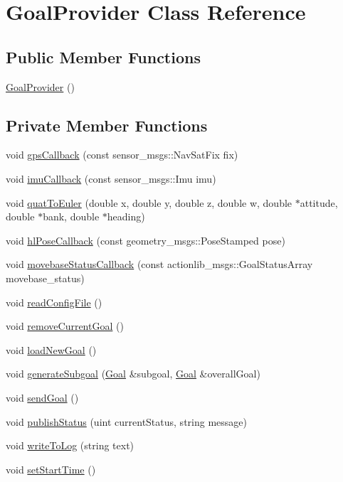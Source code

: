 \hypertarget{classGoalProvider}{\section{\-Goal\-Provider \-Class \-Reference}
\label{classGoalProvider}
}
\subsection*{\-Public \-Member \-Functions}
\begin{DoxyCompactItemize}
\item 
\hyperlink{classGoalProvider_a5f01df42b1cce4fd1ef3aee990ee2442}{\-Goal\-Provider} ()
\end{DoxyCompactItemize}
\subsection*{\-Private \-Member \-Functions}
\begin{DoxyCompactItemize}
\item 
void \hyperlink{classGoalProvider_aa68c410fb110c40cc31dc99320f20a60}{gps\-Callback} (const sensor\-\_\-msgs\-::\-Nav\-Sat\-Fix fix)
\item 
void \hyperlink{classGoalProvider_a9aa7639c95eff543d55fef82ba005088}{imu\-Callback} (const sensor\-\_\-msgs\-::\-Imu imu)
\item 
void \hyperlink{classGoalProvider_a5448a289886afe3e96a900bd0b8557d4}{quat\-To\-Euler} (double x, double y, double z, double w, double $\ast$attitude, double $\ast$bank, double $\ast$heading)
\item 
void \hyperlink{classGoalProvider_a6e91d11b611820597420497fd82613d1}{hl\-Pose\-Callback} (const geometry\-\_\-msgs\-::\-Pose\-Stamped pose)
\item 
void \hyperlink{classGoalProvider_a13d66dd274899d8012a021ef2cbeab7e}{movebase\-Status\-Callback} (const actionlib\-\_\-msgs\-::\-Goal\-Status\-Array movebase\-\_\-status)
\item 
void \hyperlink{classGoalProvider_a58ec86314e501683db946eba1141d464}{read\-Config\-File} ()
\item 
void \hyperlink{classGoalProvider_a8089b33dddf424c923e74d771574edb7}{remove\-Current\-Goal} ()
\item 
void \hyperlink{classGoalProvider_aa8e215f654aa702f0ee949fb95538fed}{load\-New\-Goal} ()
\item 
void \hyperlink{classGoalProvider_aa86d86dde0ce1948dca9a06abf6b3fdd}{generate\-Subgoal} (\hyperlink{classGoal}{\-Goal} \&subgoal, \hyperlink{classGoal}{\-Goal} \&overall\-Goal)
\item 
void \hyperlink{classGoalProvider_ace0fb8a759d933ba643664e4f261241e}{send\-Goal} ()
\item 
void \hyperlink{classGoalProvider_a3ce49c1e51eae73ba9820b89f03b8e5a}{publish\-Status} (uint current\-Status, string message)
\item 
void \hyperlink{classGoalProvider_accc06df736068317e64060ceae2512ae}{write\-To\-Log} (string text)
\item 
void \hyperlink{classGoalProvider_a967141633b8fba8dcc158074775fb1a1}{set\-Start\-Time} ()
\end{DoxyCompactItemize}
